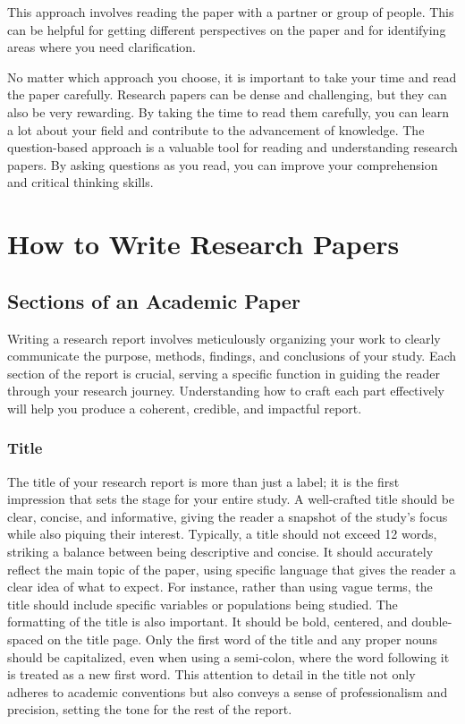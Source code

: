 \documentclass[
]{book}
\begin{document}
This approach involves reading the paper with a partner or group of people. This can be helpful for getting different perspectives on the paper and for identifying areas where you need clarification.

No matter which approach you choose, it is important to take your time and read the paper carefully. Research papers can be dense and challenging, but they can also be very rewarding. By taking the time to read them carefully, you can learn a lot about your field and contribute to the advancement of knowledge. The question-based approach is a valuable tool for reading and understanding research papers. By asking questions as you read, you can improve your comprehension and critical thinking skills.

\section{How to Write Research Papers}\label{write}

\subsection*{Sections of an Academic Paper}\label{sections-of-an-academic-paper}

Writing a research report involves meticulously organizing your work to clearly communicate the purpose, methods, findings, and conclusions of your study. Each section of the report is crucial, serving a specific function in guiding the reader through your research journey. Understanding how to craft each part effectively will help you produce a coherent, credible, and impactful report.

\subsubsection*{Title}\label{title}

The title of your research report is more than just a label; it is the first impression that sets the stage for your entire study. A well-crafted title should be clear, concise, and informative, giving the reader a snapshot of the study's focus while also piquing their interest. Typically, a title should not exceed 12 words, striking a balance between being descriptive and concise. It should accurately reflect the main topic of the paper, using specific language that gives the reader a clear idea of what to expect. For instance, rather than using vague terms, the title should include specific variables or populations being studied. The formatting of the title is also important. It should be bold, centered, and double-spaced on the title page. Only the first word of the title and any proper nouns should be capitalized, even when using a semi-colon, where the word following it is treated as a new first word. This attention to detail in the title not only adheres to academic conventions but also conveys a sense of professionalism and precision, setting the tone for the rest of the report.
\end{document}

